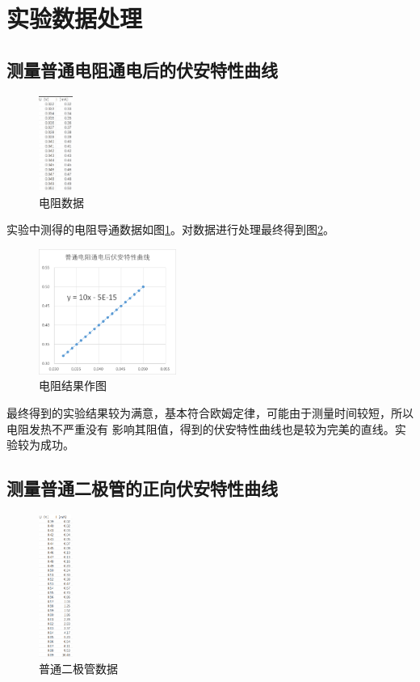 \documentclass{ctexart}
\begin{document}
\section{实验数据处理}
  \subsection{测量普通电阻通电后的伏安特性曲线}
  \begin{figure}\label{dianzushujv}
    \centering
    \includegraphics[width=0.1\textwidth,height=0.4\textheight]{dianzushujv.png}
    \caption{电阻数据}
  \end{figure}

  实验中测得的电阻导通数据如图\ref{dianzushujv}。对数据进行处理最终得到图\ref{dianzuzuotu}。

  \begin{figure}[H]\label{dianzuzuotu}
    \centering
    \includegraphics[width=0.4\textwidth,height=0.3\textheight]{dianzuzuotu.png}
    \caption{电阻结果作图}
  \end{figure}

  最终得到的实验结果较为满意，基本符合欧姆定律，可能由于测量时间较短，所以电阻发热不严重没有
  影响其阻值，得到的伏安特性曲线也是较为完美的直线。实验较为成功。

  \subsection{测量普通二极管的正向伏安特性曲线}
  \begin{figure}\label{putongshujv}
    \centering
    \includegraphics[width=0.1\textwidth,height=0.3\textheight]{putongshujv.png}
    \caption{普通二极管数据}
  \end{figure}
\end{document}
